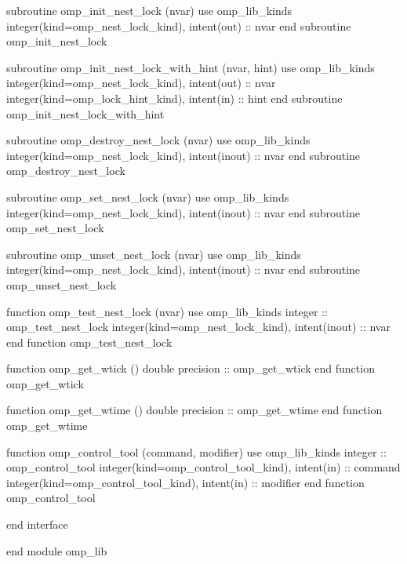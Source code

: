 {{\begin{codepar}
          subroutine omp\_init\_nest\_lock (nvar)
           use omp\_lib\_kinds
           integer(kind=omp\_nest\_lock\_kind), intent(out) :: nvar
          end subroutine omp\_init\_nest\_lock

          subroutine omp\_init\_nest\_lock\_with\_hint (nvar, hint)
           use omp\_lib\_kinds
           integer(kind=omp\_nest\_lock\_kind), intent(out) :: nvar
           integer(kind=omp\_lock\_hint\_kind), intent(in) :: hint
          end subroutine omp\_init\_nest\_lock\_with\_hint

          subroutine omp\_destroy\_nest\_lock (nvar)
           use omp\_lib\_kinds
           integer(kind=omp\_nest\_lock\_kind), intent(inout) :: nvar
          end subroutine omp\_destroy\_nest\_lock

          subroutine omp\_set\_nest\_lock (nvar)
           use omp\_lib\_kinds
           integer(kind=omp\_nest\_lock\_kind), intent(inout) :: nvar
          end subroutine omp\_set\_nest\_lock

          subroutine omp\_unset\_nest\_lock (nvar)
           use omp\_lib\_kinds
           integer(kind=omp\_nest\_lock\_kind), intent(inout) :: nvar
          end subroutine omp\_unset\_nest\_lock

          function omp\_test\_nest\_lock (nvar)
           use omp\_lib\_kinds
           integer :: omp\_test\_nest\_lock
           integer(kind=omp\_nest\_lock\_kind), intent(inout) :: nvar
          end function omp\_test\_nest\_lock

          function omp\_get\_wtick ()
           double precision :: omp\_get\_wtick
          end function omp\_get\_wtick

          function omp\_get\_wtime ()
           double precision :: omp\_get\_wtime
          end function omp\_get\_wtime
\begin{samepage}
          function omp\_control\_tool (command, modifier)
           use omp\_lib\_kinds
           integer :: omp\_control\_tool 
           integer(kind=omp\_control\_tool\_kind), intent(in) :: command
           integer(kind=omp\_control\_tool\_kind), intent(in) :: modifier
          end function omp\_control\_tool
\end{samepage}
          end interface

        end module omp\_lib
\end{codepar}} %






\pagebreak
}
